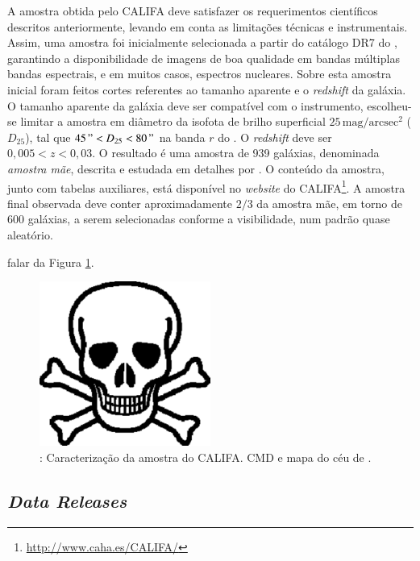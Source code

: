 A amostra obtida pelo CALIFA deve satisfazer os requerimentos científicos
descritos anteriormente, levando em conta as limitações técnicas e
instrumentais. Assim, uma amostra foi inicialmente selecionada a partir do
catálogo DR7 do \SDSS \citep{Abazajian2009}, garantindo a disponibilidade de
imagens de boa qualidade em bandas múltiplas bandas espectrais, e em muitos
casos, espectros nucleares. Sobre esta amostra inicial foram feitos cortes
referentes ao tamanho aparente e o {\em redshift} da galáxia. O tamanho aparente
da galáxia deve ser compatível com o instrumento, escolheu-se limitar a amostra
em diâmetro da isofota de brilho superficial
$25\,\mathrm{mag}/\mathrm{arcsec}^2$ ($D_{25}$), tal que $45\," < D_{25} <
80\,"$ na banda $r$ do \SDSS. O {\em redshift} deve ser $0,005 < z < 0,03$. O
resultado é uma amostra de 939 galáxias, denominada {\em amostra mãe}, descrita
e estudada em detalhes por \citet{Walcher2014}. O conteúdo da amostra, junto com
tabelas auxiliares, está disponível no {\em website} do
CALIFA\footnote{\url{http://www.caha.es/CALIFA/}}. A amostra final observada
deve conter aproximadamente $2/3$ da amostra mãe, em torno de 600 galáxias, a
serem selecionadas conforme a visibilidade, num padrão quase aleatório.

\TODO falar da Figura \ref{fig:CALIFASample}.

\begin{figure}
	\includegraphics[width=0.5\textwidth]{figuras/test.pdf}
	\caption[Caracterização da amostra do CALIFA.]
	{\TODO: Caracterização da amostra do CALIFA. CMD e mapa do céu de
	\citet{Sanchez2012}.}
	\label{fig:CALIFASample}
\end{figure}

\subsection{{\em Data Releases}}


